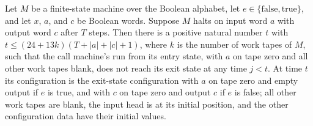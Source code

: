 \begin{theorem}
\label{Turing.FinTM.callTM_run}
\leanok
{}
Let $M$ be a finite-state machine over the Boolean alphabet, let
$e\in\{\mathrm{false},\mathrm{true}\}$, and let $x$, $a$, and $c$ be Boolean words.
Suppose $M$ halts on input word $a$ with output word $c$ after $T$ steps. Then there is
a positive natural number $t$ with $t\le (24+13k)(T+|a|+|c|+1)$, where $k$ is the number
of work tapes of $M$, such that the call machine's run from its entry state, with $a$ on
tape zero and all other work tapes blank, does not reach its exit state at any time
$j<t$. At time $t$ its configuration is the exit-state configuration with $a$ on tape
zero and empty output if $e$ is true, and with $c$ on tape zero and output $c$ if $e$ is
false; all other work tapes are blank, the input head is at its initial position, and
the other configuration data have their initial values.
\end{theorem}
